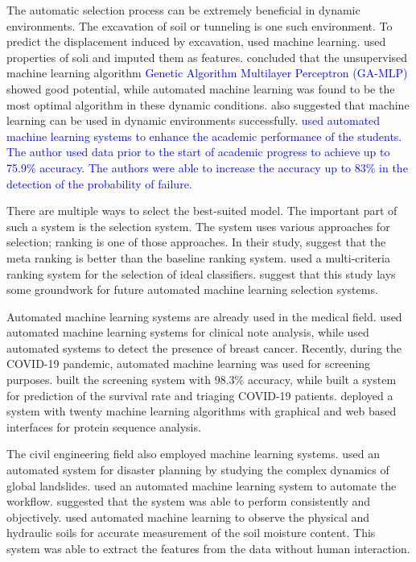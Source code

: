 \documentclass[a4paper,fleqn]{cas-dc}
\newcommand{\responsemod}{\color{blue}}
\newcommand{\responsemodsm}[1]{\textcolor{blue}{#1}}
\begin{document}
The automatic selection process can be extremely beneficial in dynamic environments. The excavation of soil or tunneling is one such environment. To predict the displacement induced by excavation, \cite*{ref_paper_1} used machine learning. \citeauthor{ref_paper_1} used properties of soli and imputed them as features. \citeauthor{ref_paper_1} concluded that the unsupervised machine learning algorithm \responsemodsm{Genetic Algorithm Multilayer Perceptron (GA-MLP)} showed good potential, while automated machine learning was found to be the most optimal algorithm in these dynamic conditions. \cite*{ref_paper_13} also suggested that machine learning can be used in dynamic environments successfully. \responsemodsm{\cite{ref_paper_a_7} used automated machine learning systems to enhance the academic performance of the students. The author used data prior to the start of academic progress to achieve up to 75.9\% accuracy. The authors were able to increase the accuracy up to 83\% in the detection of the probability of failure.}

There are multiple ways to select the best-suited model. The important part of such a system is the selection system. The system uses various approaches for selection; ranking is one of those approaches. In their study, \cite*{ref_paper_23} suggest that the meta ranking is better than the baseline ranking system. \citeauthor{ref_paper_23} used a multi-criteria ranking system for the selection of ideal classifiers. \citeauthor{ref_paper_23} suggest that this study lays some groundwork for future automated machine learning selection systems.

{\responsemod
Automated machine learning systems are already used in the medical field. \cite{ref_paper_a_2} used automated machine learning systems for clinical note analysis, while \cite{ref_paper_a_6} used automated systems to detect the presence of breast cancer. Recently, during the COVID-19 pandemic, automated machine learning was used for screening purposes. \cite{ref_paper_a_11} built the screening system with 98.3\% accuracy, while \cite{ref_paper_a_15} built a system for prediction of the survival rate and triaging COVID-19 patients. \cite{ref_paper_a_9} deployed a system with twenty machine learning algorithms with graphical and web based interfaces for protein sequence analysis.

The civil engineering field also employed machine learning systems. \cite{ref_paper_a_10} used an automated system for disaster planning by studying the complex dynamics of global landslides. \cite{ref_paper_a_13} used an automated machine learning system to automate the workflow. \citeauthor{ref_paper_a_13} suggested that the system was able to perform consistently and objectively. \cite{ref_paper_a_8} used automated machine learning to observe the physical and hydraulic soils for accurate measurement of the soil moisture content. This system was able to extract the features from the data without human interaction.
}
\end{document}
